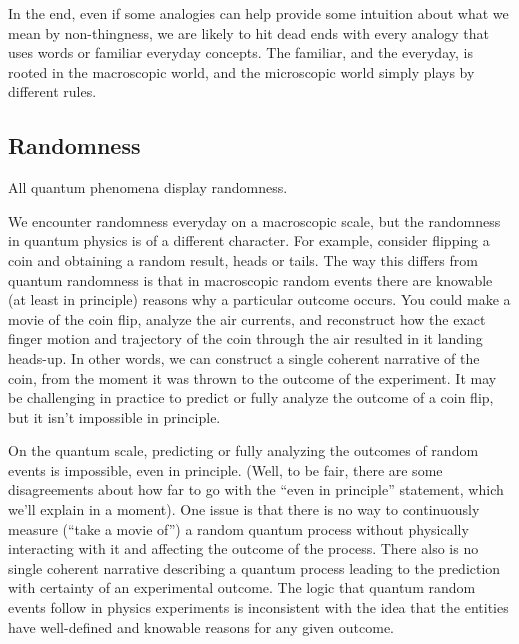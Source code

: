 \documentclass[12pt,onecolumn,preprintnumbers,amsmath,amssymbn,reprint,nofootinbib,superscriptaddress]{revtex4}    %
\begin{document}
In the end, even if some analogies can help provide some intuition about what we mean by non-thingness, we are likely to hit dead ends with every analogy that uses words or familiar everyday concepts.  The familiar, and the everyday, is rooted in the macroscopic world, and the microscopic world simply plays by different rules.

\par 
\subsection{Randomness}
%
All quantum phenomena display randomness.  

We encounter randomness everyday on a macroscopic scale, but the randomness in quantum physics is of a different character.  For example, consider flipping a coin and obtaining a random result, heads or tails.  The way this differs from quantum randomness is that in macroscopic random events there are knowable (at least in principle) reasons why a particular outcome occurs.  You could make a movie of the coin flip, analyze the air currents, and reconstruct how the exact finger motion and trajectory of the coin through the air resulted in it landing heads-up.  In other words, we can construct a single coherent narrative of the coin, from the moment it was thrown to the outcome of the experiment.  It may be challenging in practice to predict or fully analyze the outcome of a coin flip, but it isn't impossible in principle. 

On the quantum scale, predicting or fully analyzing the outcomes of random events is impossible, even in principle.  (Well, to be fair, there are some disagreements about how far to go with the ``even in principle'' statement, which we'll explain in a moment).  One issue is that there is no way to continuously measure  (``take a movie of'') a random quantum process without physically interacting with it and affecting the outcome of the process.  There also is no single coherent narrative describing a quantum process leading to the prediction with certainty of an experimental outcome.  The logic that quantum random events follow in physics experiments is inconsistent with the idea that the entities have well-defined and knowable reasons for any given outcome.  
\end{document}
